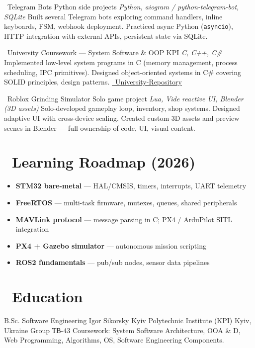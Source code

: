 \documentclass[11pt,a4paper,sans]{moderncv}
\begin{document}
        {\faRobot\ Telegram Bots}
        {Python side projects}
        {}
        {\textit{Python, aiogram / python-telegram-bot, SQLite}}
        {\small Built several Telegram bots exploring command handlers, inline keyboards, FSM, webhook deployment. Practiced async Python (\texttt{asyncio}), HTTP integration with external APIs, persistent state via SQLite.}

        {\faGraduationCap\ University Coursework — System Software \& OOP}
        {KPI}
        {}
        {\textit{C, C++, C\#}}
        {\small Implemented low-level system programs in C (memory management, process scheduling, IPC primitives). Designed object-oriented systems in C\# covering SOLID principles, design patterns. \href{https://github.com/d3Par1/University-Repository}{\faGithub\ University-Repository}}

        {\faGamepad\ Roblox Grinding Simulator}
        {Solo game project}
        {}
        {\textit{Lua, Vide reactive UI, Blender (3D assets)}}
        {\small Solo-developed gameplay loop, inventory, shop systems. Designed adaptive UI with cross-device scaling. Created custom 3D assets and preview scenes in Blender — full ownership of code, UI, visual content.}

\section{\faRoad\ Learning Roadmap (2026)}
\begin{itemize}
    \item[\faChevronRight] \small \textbf{STM32 bare-metal} — HAL/CMSIS, timers, interrupts, UART telemetry
    \item[\faChevronRight] \small \textbf{FreeRTOS} — multi-task firmware, mutexes, queues, shared peripherals
    \item[\faChevronRight] \small \textbf{MAVLink protocol} — message parsing in C; PX4 / ArduPilot SITL integration
    \item[\faChevronRight] \small \textbf{PX4 + Gazebo simulator} — autonomous mission scripting
    \item[\faChevronRight] \small \textbf{ROS2 fundamentals} — pub/sub nodes, sensor data pipelines
\end{itemize}

\section{\faUniversity\ Education}
        {B.Sc. Software Engineering}
        {Igor Sikorsky Kyiv Polytechnic Institute (KPI)}
        {Kyiv, Ukraine}
        {Group \textukrainian{ТВ}-43}
        {\small Coursework: System Software Architecture, OOA \& D, Web Programming, Algorithms, OS, Software Engineering Components.}
\end{document}
